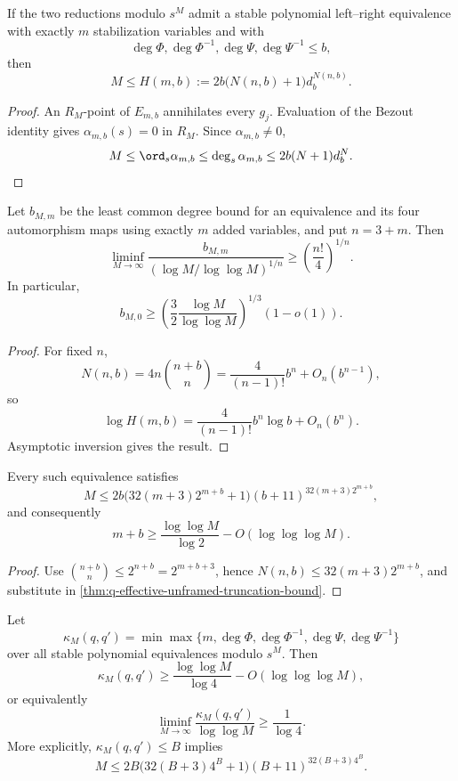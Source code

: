 \begin{theorem}
\label{thm:q-effective-unframed-truncation-bound}
If the two reductions modulo \(s^M\) admit a stable polynomial left--right
equivalence with exactly \(m\) stabilization variables and with
\[
 \deg\Phi,\deg\Phi^{-1},\deg\Psi,\deg\Psi^{-1}\le b,
\]
then
\[
 \boxed{
 M\le H(m,b):=
 2b\bigl(N(n,b)+1\bigr)d_b^{N(n,b)}.}
\]
\end{theorem}

\begin{proof}
An \(R_M\)-point of \(E_{m,b}\) annihilates every \(g_j\).  Evaluation of
the Bezout identity gives \(\alpha_{m,b}(s)=0\) in \(R_M\).  Since
\(\alpha_{m,b}\ne0\),
\[
 M\le\ord_s\alpha_{m,b}
 \le\deg_s\alpha_{m,b}
 \le2b(N+1)d_b^N.
\]
\end{proof}

\begin{corollary}
\label{cor:q-fixed-stabilization-degree-rate}
Let \(b_{M,m}\) be the least common degree bound for an equivalence and its
four automorphism maps using exactly \(m\) added variables, and put
\(n=3+m\).  Then
\[
 \liminf_{M\to\infty}
 \frac{b_{M,m}}{(\log M/\log\log M)^{1/n}}
 \ge\left(\frac{n!}{4}\right)^{1/n}.
\]
In particular,
\[
 b_{M,0}\ge
 \left(\frac32\frac{\log M}{\log\log M}\right)^{1/3}(1-o(1)).
\]
\end{corollary}

\begin{proof}
For fixed \(n\),
\[
 N(n,b)=4n\binom{n+b}{n}
 =\frac4{(n-1)!}b^n+O_n(b^{n-1}),
\]
so
\[
 \log H(m,b)
 =\frac4{(n-1)!}b^n\log b+O_n(b^n).
\]
Asymptotic inversion gives the result.
\end{proof}

\begin{corollary}
\label{cor:q-stabilization-degree-tradeoff}
Every such equivalence satisfies
\[
 M\le
 2b\bigl(32(m+3)2^{m+b}+1\bigr)
 (b+11)^{32(m+3)2^{m+b}},
\]
and consequently
\[
 m+b\ge\frac{\log\log M}{\log2}
       -O(\log\log\log M).
\]
\end{corollary}

\begin{proof}
Use
\(\binom{n+b}{n}\le2^{n+b}=2^{m+b+3}\), hence
\(N(n,b)\le32(m+3)2^{m+b}\), and substitute in
\cref{thm:q-effective-unframed-truncation-bound}.
\end{proof}

\begin{corollary}
\label{cor:q-unrestricted-complexity-rate}
Let
\[
 \kappa_M(q,q')=
 \min\max\{m,\deg\Phi,\deg\Phi^{-1},
              \deg\Psi,\deg\Psi^{-1}\}
\]
over all stable polynomial equivalences modulo \(s^M\).  Then
\[
 \boxed{
 \kappa_M(q,q')
 \ge\frac{\log\log M}{\log4}
      -O(\log\log\log M),}
\]
or equivalently
\[
 \boxed{
 \liminf_{M\to\infty}
 \frac{\kappa_M(q,q')}{\log\log M}\ge\frac1{\log4}.}
\]
More explicitly, \(\kappa_M(q,q')\le B\) implies
\[
 M\le
 2B\bigl(32(B+3)4^B+1\bigr)
 (B+11)^{32(B+3)4^B}.
\]
\end{corollary}

